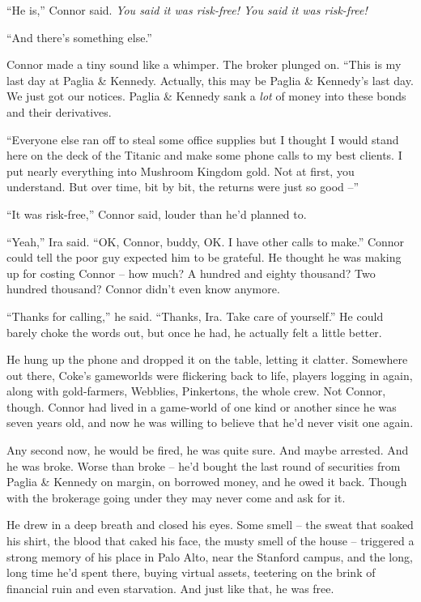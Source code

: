 ``He is,'' Connor said.
\emph{You said it was risk-free! You said it was risk-free!}

``And there's something else.''

Connor made a tiny sound like a whimper. The broker plunged on.
``This is my last day at Paglia \& Kennedy. Actually, this may be
Paglia \& Kennedy's last day. We just got our notices. Paglia \&
Kennedy sank a \emph{lot} of money into these bonds and their
derivatives.

``Everyone else ran off to steal some office supplies but I thought
I would stand here on the deck of the Titanic and make some phone
calls to my best clients. I put nearly everything into Mushroom
Kingdom gold. Not at first, you understand. But over time, bit by
bit, the returns were just so good --''

``It was risk-free,'' Connor said, louder than he'd planned to.

``Yeah,'' Ira said. ``OK, Connor, buddy, OK. I have other calls to
make.'' Connor could tell the poor guy expected him to be grateful.
He thought he was making up for costing Connor -- how much? A
hundred and eighty thousand? Two hundred thousand? Connor didn't
even know anymore.

``Thanks for calling,'' he said. ``Thanks, Ira. Take care of
yourself.'' He could barely choke the words out, but once he had, he
actually felt a little better.

He hung up the phone and dropped it on the table, letting it
clatter. Somewhere out there, Coke's gameworlds were flickering
back to life, players logging in again, along with gold-farmers,
Webblies, Pinkertons, the whole crew. Not Connor, though. Connor
had lived in a game-world of one kind or another since he was seven
years old, and now he was willing to believe that he'd never visit
one again.

Any second now, he would be fired, he was quite sure. And maybe
arrested. And he was broke. Worse than broke -- he'd bought the
last round of securities from Paglia \& Kennedy on margin, on
borrowed money, and he owed it back. Though with the brokerage
going under they may never come and ask for it.

He drew in a deep breath and closed his eyes. Some smell -- the
sweat that soaked his shirt, the blood that caked his face, the
musty smell of the house -- triggered a strong memory of his place
in Palo Alto, near the Stanford campus, and the long, long time
he'd spent there, buying virtual assets, teetering on the brink of
financial ruin and even starvation. And just like that, he was
free.

